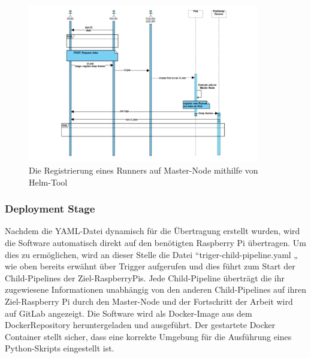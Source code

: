 \begin{figure}[bth] 
	\centering
	\includegraphics[width=0.9\textwidth]{Graphics/register-temp-runner.png}
	\caption{Die Registrierung eines Runners auf Master-Node mithilfe von Helm-Tool}
	\label{fig:rigister-temp-runner}
\end{figure}



\subsubsection*{Deployment Stage}

Nachdem die YAML-Datei dynamisch für die Übertragung erstellt wurden, wird die Software automatisch direkt auf den benötigten Raspberry Pi übertragen. Um dies zu ermöglichen, wird an dieser Stelle die Datei “triger-child-pipeline.yaml „ wie oben bereits erwähnt über Trigger aufgerufen und dies führt zum Start der Child-Pipelines der Ziel-RaspberryPis. Jede Child-Pipeline überträgt die ihr zugewiesene Informationen unabhängig von den anderen Child-Pipelines auf ihren Ziel-Raspberry Pi durch den Master-Node und der Fortschritt der Arbeit wird auf GitLab angezeigt. Die Software wird als Docker-Image aus dem DockerRepository heruntergeladen und ausgeführt. Der gestartete Docker Container stellt sicher, dass eine korrekte Umgebung für die Ausführung eines Python-Skripts eingestellt ist.



